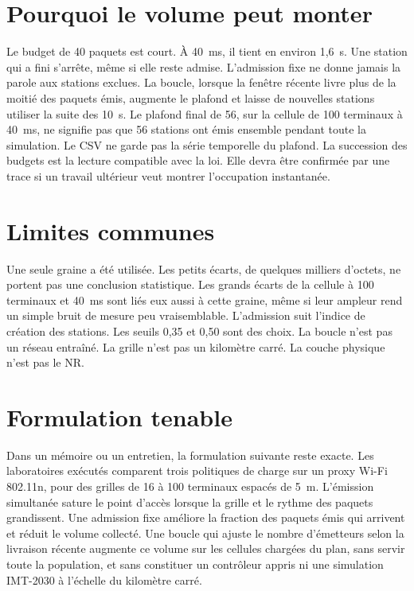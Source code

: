 \documentclass[11pt,a4paper]{article}
\begin{document}
\section{Pourquoi le volume peut monter}

Le budget de 40 paquets est court. À 40~ms, il tient en environ 1,6~s. Une station qui a fini s'arrête, même si elle reste admise. L'admission fixe ne donne jamais la parole aux stations exclues. La boucle, lorsque la fenêtre récente livre plus de la moitié des paquets émis, augmente le plafond et laisse de nouvelles stations utiliser la suite des 10~s. Le plafond final de 56, sur la cellule de 100 terminaux à 40~ms, ne signifie pas que 56 stations ont émis ensemble pendant toute la simulation. Le CSV ne garde pas la série temporelle du plafond. La succession des budgets est la lecture compatible avec la loi. Elle devra être confirmée par une trace si un travail ultérieur veut montrer l'occupation instantanée.

\section{Limites communes}

Une seule graine a été utilisée. Les petits écarts, de quelques milliers d'octets, ne portent pas une conclusion statistique. Les grands écarts de la cellule à 100 terminaux et 40~ms sont liés eux aussi à cette graine, même si leur ampleur rend un simple bruit de mesure peu vraisemblable. L'admission suit l'indice de création des stations. Les seuils 0,35 et 0,50 sont des choix. La boucle n'est pas un réseau entraîné. La grille n'est pas un kilomètre carré. La couche physique n'est pas le NR.

\section{Formulation tenable}

Dans un mémoire ou un entretien, la formulation suivante reste exacte. Les laboratoires exécutés comparent trois politiques de charge sur un proxy Wi-Fi 802.11n, pour des grilles de 16 à 100 terminaux espacés de 5~m. L'émission simultanée sature le point d'accès lorsque la grille et le rythme des paquets grandissent. Une admission fixe améliore la fraction des paquets émis qui arrivent et réduit le volume collecté. Une boucle qui ajuste le nombre d'émetteurs selon la livraison récente augmente ce volume sur les cellules chargées du plan, sans servir toute la population, et sans constituer un contrôleur appris ni une simulation IMT-2030 à l'échelle du kilomètre carré.
\end{document}
